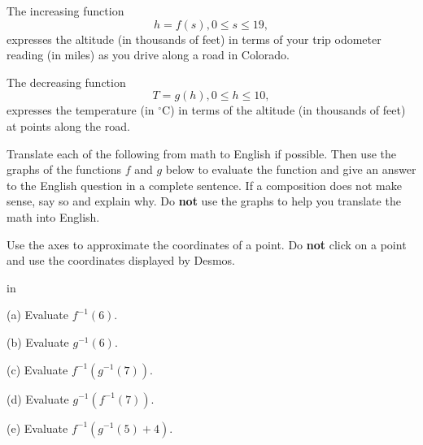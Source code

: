\documentclass{ximera}
\newcommand{\pskip}{\vskip 0.1 in}
\begin{document}
\begin{example} \label{Ex5:Inverses}
The increasing function
\[
     h = f(s) , 0\leq s \leq 19 ,
\]
expresses the altitude (in thousands of feet) in terms of your trip odometer reading (in miles) as you drive along a road in Colorado. 

The decreasing function 
\[
  T = g(h) , 0\leq h \leq 10 ,
\]
expresses the temperature (in $^\circ$C) in terms of the altitude (in thousands of feet) at points along the road.

Translate each of the following from math to English if possible. Then use the graphs of the functions $f$ and $g$ below to evaluate the function and give an answer to the English question in a complete sentence. If a composition does not make sense, say so and explain why. Do {\bf not} use the graphs to help you translate the math into English.

Use the axes to approximate the coordinates of a point. Do {\bf not} click on a point and use the coordinates displayed by Desmos.

\pskip

(a) Evaluate $f^{-1}(6)$.

(b) Evaluate $g^{-1}(6)$.

(c) Evaluate $f^{-1}(g^{-1}(7))$.

(d) Evaluate $g^{-1}(f^{-1}(7))$.

(e) Evaluate $f^{-1}(g^{-1}(5)+4)$.

\begin{exploration}

 
\begin{onlineOnly}
    \begin{center}
\end{center}
\end{onlineOnly}
\end{exploration}

\end{example}
\end{document}
